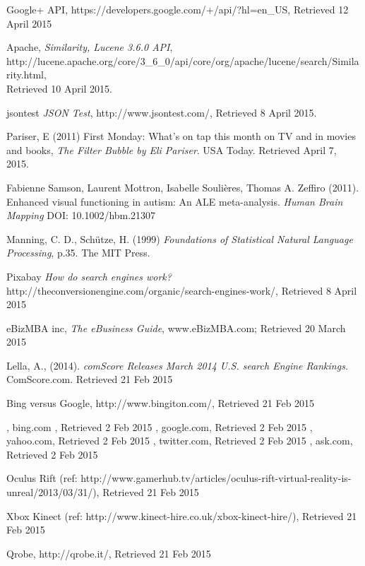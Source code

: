 \documentclass[a4paper, 11pt]{article}
\begin{document}
\begin{thebibliography}{100}
 Google+ API, https://developers.google.com/+/api/?hl=en\_US, Retrieved 12 April 2015

 Apache, \textit{Similarity, Lucene 3.6.0 API},  \\http://lucene.apache.org/core/3\_6\_0/api/core/org/apache/lucene/search/Similarity.html, \\Retrieved 10 April 2015.

jsontest \textit{JSON Test}, http://www.jsontest.com/, Retrieved 8 April 2015.

 Pariser, E (2011) First Monday: What's on tap this month on TV and in movies and books, \textit{The Filter Bubble by Eli Pariser}. USA Today. Retrieved April 7, 2015. 

Fabienne Samson, Laurent Mottron, Isabelle Soulières, Thomas A. Zeffiro (2011). Enhanced visual functioning in autism: An ALE meta-analysis. \textit{Human Brain Mapping} DOI: 10.1002/hbm.21307

Manning, C. D., Schütze, H. (1999) \textit{Foundations of Statistical Natural Language Processing}, p.35. The MIT Press.

 Pixabay \textit{How do search engines work?} http://theconversionengine.com/organic/search-engines-work/, Retrieved 8 April 2015

eBizMBA inc, \textit{The eBusiness Guide}, www.eBizMBA.com; Retrieved 20 March 2015

Lella, A., (2014). \textit{comScore Releases March 2014 U.S. search Engine Rankings.} ComScore.com. Retrieved 21 Feb 2015

 Bing versus Google, http://www.bingiton.com/, Retrieved 21 Feb 2015 

 , bing.com , Retrieved 2 Feb 2015 
 , google.com, Retrieved 2 Feb 2015 
 , yahoo.com, Retrieved 2 Feb 2015 
, twitter.com, Retrieved 2 Feb 2015 
, ask.com, Retrieved 2 Feb 2015 

 Oculus Rift (ref: http://www.gamerhub.tv/articles/oculus-rift-virtual-reality-is-unreal/2013/03/31/), Retrieved 21 Feb 2015 

 Xbox Kinect (ref: http://www.kinect-hire.co.uk/xbox-kinect-hire/), Retrieved 21 Feb 2015

 Qrobe, http://qrobe.it/, Retrieved 21 Feb 2015 


\end{thebibliography}
\end{document}
